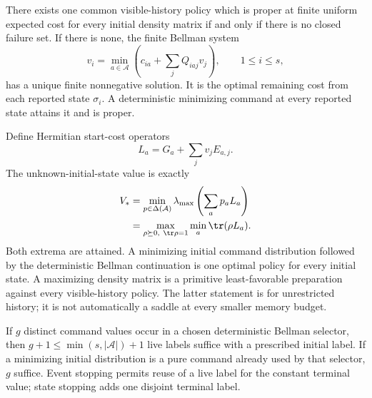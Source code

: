 \begin{theorem}\label{thm:reset-control}
There exists one common visible-history policy which is proper at finite uniform expected cost for every initial density matrix if and only if there is no closed failure set. If there is none, the finite Bellman system
\begin{equation}\label{eq:reset-bellman}
 v_i=\min_{a\in\mathcal A}\left(c_{ia}+\sum_jQ_{iaj}v_j\right),\qquad 1\le i\le s,
\end{equation}
has a unique finite nonnegative solution. It is the optimal remaining cost from each reported state $\sigma_i$. A deterministic minimizing command at every reported state attains it and is proper.

Define Hermitian start-cost operators
\[
 L_a=G_a+\sum_jv_jE_{a,j}.
\]
The unknown-initial-state value is exactly
\begin{align}
 V_*&=\min_{p\in\Delta(\mathcal A)}\lambda_{\max}\left(\sum_a p_a L_a\right)\label{eq:reset-sdp}\\
 &=\max_{\rho\succeq0,\ \tr\rho=1}\min_a\tr(\rho L_a).\label{eq:reset-dual}
\end{align}
Both extrema are attained. A minimizing initial command distribution followed by the deterministic Bellman continuation is one optimal policy for every initial state. A maximizing density matrix is a primitive least-favorable preparation against every visible-history policy. The latter statement is for unrestricted history; it is not automatically a saddle at every smaller memory budget.

If $g$ distinct command values occur in a chosen deterministic Bellman selector, then $g+1\le\min(s,|\mathcal A|)+1$ live labels suffice with a prescribed initial label. If a minimizing initial distribution is a pure command already used by that selector, $g$ suffice. Event stopping permits reuse of a live label for the constant terminal value; state stopping adds one disjoint terminal label.
\end{theorem}
